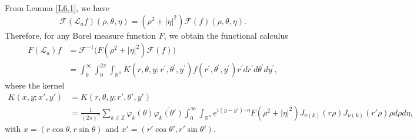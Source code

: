 \documentclass[a4paper,11pt, reqno]{amsart}
\numberwithin{equation}{section}
\theoremstyle{plain}
\theoremstyle{definition}
\theoremstyle{remark}
\begin{document}
From Lemma \ref{L6.1}, we have
\begin{equation*}
	\mathcal{F}(\mathcal{L}_a f)(\rho, \theta, \eta) = (\rho^2 + |\eta|^2)\mathcal{F}(f)(\rho, \theta, \eta).
\end{equation*}
Therefore, for any Borel measure function $F$, we obtain the functional calculus
\begin{align*}
	F(\mathcal{L} _a)f&=\mathcal{F} ^{-1}\bigl( F(\rho ^2+|\eta |^2)\mathcal{F} (f) \bigr)\\
	&=\int_0^{\infty}{\int_0^{2\pi}{\int_{\mathbb{R} ^n}{K(r,\theta ,y;r^{\prime},\theta ^{\prime},y^{\prime})f(r^{\prime},\theta ^{\prime},y^{\prime})r^{\prime}dr^{\prime}d\theta ^{\prime}dy^{\prime}}}}, 
\end{align*}
where the kernel
\begin{align*}
		K(x, y; x', y')&=K(r, \theta, y; r', \theta', y')\\
		&=\frac{1}{(2\pi)^n}\sum_{k \in \mathbb{Z}} \varphi_k(\theta)\overline{\varphi_k(\theta')} \int_0^\infty \int_{\mathbb{R}^n} e^{i(y - y')\cdot\eta} F(\rho^2 + |\eta|^2) J_{\nu(k)}(r\rho) J_{\nu(k)}(r'\rho) \rho d\rho d\eta,
\end{align*}
with $x=(r\cos \theta,r\sin\theta)$ and $x'=(r'\cos \theta',r'\sin\theta')$.
\end{document}
